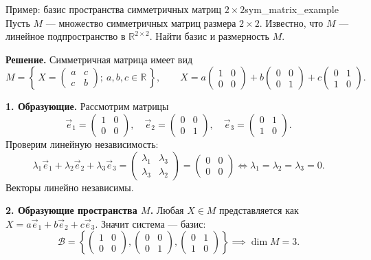 \documentclass[12pt,a4paper]{article}
\begin{document}
\begin{definition}{Пример: базис пространства симметричных
  матриц $2\times 2$}{sym_matrix_example}
  Пусть $M$ --- множество симметричных матриц размера $2 \times 2$.
  Известно, что $M$ --- линейное подпространство в
  $\mathbb{R}^{2\times 2}$. Найти базис и размерность $M$.

  \textbf{Решение.} Симметричная матрица имеет вид
  \[
    M = \left\{\, X =
      \begin{pmatrix} a & c \\ c & b
      \end{pmatrix}; \ a, b, c \in
    \mathbb{R} \,\right\}, \qquad
    X = a
    \begin{pmatrix} 1 & 0 \\ 0 & 0
    \end{pmatrix} + b
    \begin{pmatrix} 0 & 0 \\ 0 & 1
    \end{pmatrix} + c
    \begin{pmatrix} 0 & 1 \\ 1 & 0
    \end{pmatrix}.
  \]

  \textbf{1. Образующие.} Рассмотрим матрицы
  \[
    \vec{e}_1 =
    \begin{pmatrix} 1 & 0 \\ 0 & 0
    \end{pmatrix}, \quad
    \vec{e}_2 =
    \begin{pmatrix} 0 & 0 \\ 0 & 1
    \end{pmatrix}, \quad
    \vec{e}_3 =
    \begin{pmatrix} 0 & 1 \\ 1 & 0
    \end{pmatrix}.
  \]
  Проверим линейную независимость:
  \[
    \lambda_1\vec{e}_1 + \lambda_2\vec{e}_2 + \lambda_3\vec{e}_3 =
    \begin{pmatrix} \lambda_1 & \lambda_3 \\ \lambda_3 & \lambda_2
    \end{pmatrix} =
    \begin{pmatrix} 0 & 0 \\ 0 & 0
    \end{pmatrix}
    \iff \lambda_1 = \lambda_2 = \lambda_3 = 0.
  \]
  Векторы линейно независимы.

  \textbf{2. Образующие пространства $M$.} Любая $X \in M$
  представляется как $X = a\vec{e}_1 + b\vec{e}_2 + c\vec{e}_3$.
  Значит система --- базис:
  \[
    \mathcal{B} = \left\{
      \begin{pmatrix} 1 & 0 \\ 0 & 0
      \end{pmatrix},
      \begin{pmatrix} 0 & 0 \\ 0 & 1
      \end{pmatrix},
      \begin{pmatrix} 0 & 1 \\ 1 & 0
      \end{pmatrix}
    \right\} \implies \dim M = 3.
  \]
\end{definition}
\end{document}
